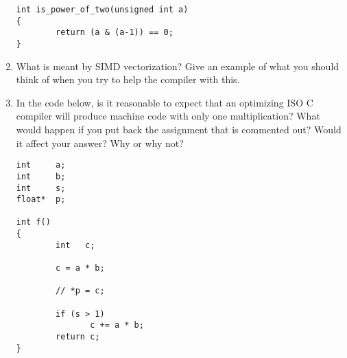 \documentclass{article}
\begin{document}
\begin{enumerate}
\begin{verbatim}
int is_power_of_two(unsigned int a)
{
        return (a & (a-1)) == 0;
}
\end{verbatim}

\item What is meant by SIMD vectorization? Give an example of what you should think of when you try to help the compiler 
with this.

\item In the code below, is it reasonable to expect that an optimizing ISO C compiler will produce machine code with only one multiplication? What would happen if you put back the assignment that is commented out? Would it affect your answer? Why or why not?

\begin{verbatim}
int     a;
int     b;
int     s;
float*  p;

int f()
{
        int   c;

        c = a * b;

        // *p = c;

        if (s > 1)
               c += a * b; 
        return c;
}
\end{verbatim}

\end{enumerate}
\end{document}

